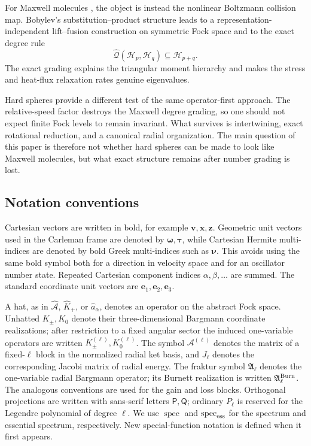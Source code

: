 \documentclass[11pt]{article}
\numberwithin{equation}{section}
\theoremstyle{definition}
\begin{document}
For Maxwell molecules \cite{KarlinMaxwell2026}, the object is instead the
nonlinear Boltzmann collision map.  Bobylev's substitution--product structure
leads to a representation-independent lift--fusion construction on symmetric
Fock space and to the exact degree rule
\begin{equation}
 \widehat{\mathcal Q}(\mathscr H_p,\mathscr H_q)
 \subseteq \mathscr H_{p+q}.
 \label{eq:intro_maxwell_grading}
\end{equation}
The exact grading explains the triangular moment hierarchy and makes the
stress and heat-flux relaxation rates genuine eigenvalues.

Hard spheres provide a different test of the same operator-first approach.
The relative-speed factor destroys the Maxwell degree grading, so one should
not expect finite Fock levels to remain invariant.  What survives is
intertwining, exact rotational reduction, and a canonical radial organization.
The main question of this paper is therefore not whether hard spheres can be
made to look like Maxwell molecules, but what exact structure remains after
number grading is lost.

\subsection{Notation conventions}

Cartesian vectors are written in bold, for example $\bm v,\bm x,\bm z$.
Geometric unit vectors used in the Carleman frame are denoted by
$\bm\omega,\bm\tau$, while Cartesian Hermite multi-indices are denoted by
bold Greek multi-indices such as $\boldsymbol{\nu}$.  This avoids using the
same bold symbol both for a direction in velocity space and for an oscillator
number state.  Repeated Cartesian component indices
$\alpha,\beta,\ldots$ are summed.  The standard coordinate unit vectors are
$\bm e_1,\bm e_2,\bm e_3$.

A hat, as in $\widehat{\mathcal A}$, $\widehat K_+$, or
$\hat a_\alpha$, denotes an operator on the abstract Fock space.  Unhatted $K_\pm,K_0$ denote their three-dimensional Bargmann coordinate
realizations; after restriction to a fixed angular sector the induced
one-variable operators are written $K_\pm^{(\ell)},K_0^{(\ell)}$.  The symbol $\mathcal A^{(\ell)}$ denotes
the matrix of a fixed-$\ell$ block in the normalized radial ket basis, and
$J_\ell$ denotes the corresponding Jacobi matrix of radial energy.  The
fraktur symbol $\mathfrak A_\ell$ denotes the one-variable radial Bargmann
operator; its Burnett realization is written $\mathfrak A_\ell^{\rm Burn}$.
The analogous conventions are used for the gain and loss blocks.  Orthogonal
projections are written with sans-serif letters $\mathsf P,\mathsf Q$;
ordinary $P_\ell$ is reserved for the Legendre polynomial of degree $\ell$.
We use $\operatorname{spec}$ and $\operatorname{spec}_{\rm ess}$ for the
spectrum and essential spectrum, respectively.  New special-function notation
is defined when it first appears.
\end{document}
